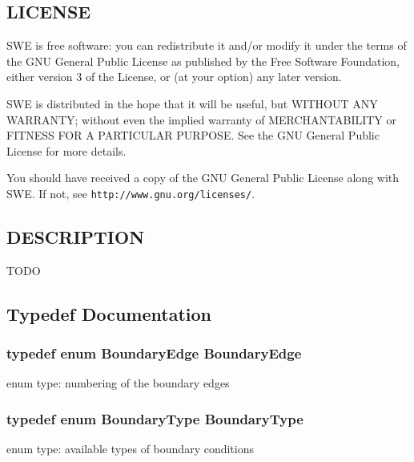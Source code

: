 \subsection{L\-I\-C\-E\-N\-S\-E}\label{Writer_8hh_LICENSE}
S\-W\-E is free software\-: you can redistribute it and/or modify it under the terms of the G\-N\-U General Public License as published by the Free Software Foundation, either version 3 of the License, or (at your option) any later version.

S\-W\-E is distributed in the hope that it will be useful, but W\-I\-T\-H\-O\-U\-T A\-N\-Y W\-A\-R\-R\-A\-N\-T\-Y; without even the implied warranty of M\-E\-R\-C\-H\-A\-N\-T\-A\-B\-I\-L\-I\-T\-Y or F\-I\-T\-N\-E\-S\-S F\-O\-R A P\-A\-R\-T\-I\-C\-U\-L\-A\-R P\-U\-R\-P\-O\-S\-E. See the G\-N\-U General Public License for more details.

You should have received a copy of the G\-N\-U General Public License along with S\-W\-E. If not, see {\tt http\-://www.\-gnu.\-org/licenses/}.\subsection{D\-E\-S\-C\-R\-I\-P\-T\-I\-O\-N}\label{NetCdfWriter_8hh_DESCRIPTION}
T\-O\-D\-O 

\subsection{Typedef Documentation}
\subsubsection[{Boundary\-Edge}]{\setlength{\rightskip}{0pt plus 5cm}typedef enum {\bf Boundary\-Edge}  {\bf Boundary\-Edge}}\label{SWE__Scenario_8hh_a53b43e70a19e542b4c1ab2da9c6bcc0e}
enum type\-: numbering of the boundary edges 
\subsubsection[{Boundary\-Type}]{\setlength{\rightskip}{0pt plus 5cm}typedef enum {\bf Boundary\-Type}  {\bf Boundary\-Type}}\label{SWE__Scenario_8hh_a0076a482278ddc13ed179c6c76c9b5ad}
enum type\-: available types of boundary conditions 

